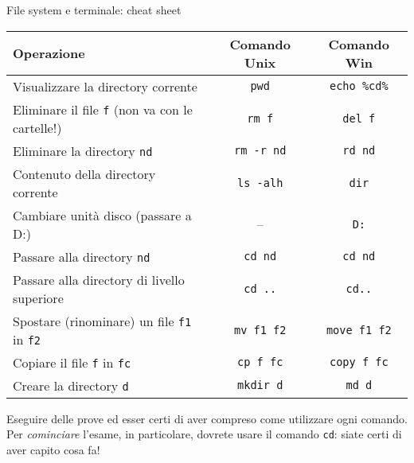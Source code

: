 \documentclass[presentation]{beamer}
\begin{document}
\begin{frame}[fragile]{File system e terminale: cheat sheet}
\label{slide:commands}
  \begin{center}
    \begin{tabular}{| l | c | c |}
      \hline
      \textbf{Operazione} & \textbf{Comando Unix} & \textbf{Comando Win} \\ \hline
      \scriptsize{}Visualizzare la directory corrente & \texttt{pwd} & \texttt{echo \%cd\%}  \\ \hline
      \scriptsize{}Eliminare il file \texttt{f} (non va con le cartelle!) & \texttt{rm f} & \texttt{del f} \\ \hline
      \scriptsize{}Eliminare la directory \texttt{nd} & \texttt{rm -r nd} & \texttt{rd nd} \\ \hline
      \scriptsize{}Contenuto della directory corrente & \texttt{ls -alh} & \texttt{dir} \\ \hline
      \scriptsize{}Cambiare unità disco (passare a D:) & -- & \texttt{D:} \\ \hline
      \scriptsize{}Passare alla directory \texttt{nd} & \texttt{cd nd} & \texttt{cd nd} \\ \hline
      \scriptsize{}Passare alla directory di livello superiore & \texttt{cd ..} & \texttt{cd..} \\ \hline
      \scriptsize{}Spostare (rinominare) un file \texttt{f1} in \texttt{f2} & \texttt{mv f1 f2} & \texttt{move f1 f2} \\ \hline
      \scriptsize{}Copiare il file \texttt{f} in \texttt{fc} & \texttt{cp f fc} & \texttt{copy f fc} \\ \hline
      \scriptsize{}Creare la directory \texttt{d} & \texttt{mkdir d} & \texttt{md d} \\ \hline
    \end{tabular}
  \end{center}
  Eseguire delle prove ed esser certi di aver compreso come utilizzare ogni comando. Per \emph{cominciare} l'esame, in particolare, dovrete usare il comando \texttt{cd}: siate certi di aver capito cosa fa!
\end{frame}
\end{document}
